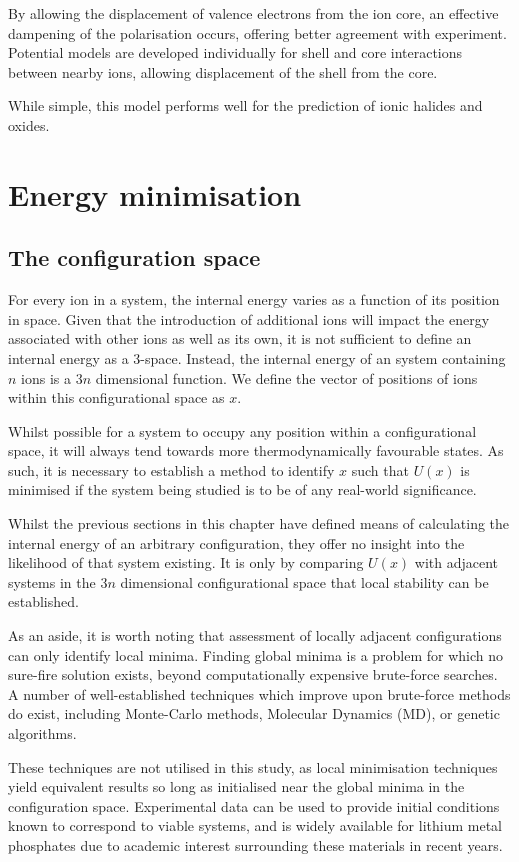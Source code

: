 By allowing the displacement of valence electrons from the ion core, an effective dampening of the polarisation occurs, offering better agreement with experiment.
Potential models are developed individually for shell and core interactions between nearby ions, allowing displacement of the shell from the core.


While simple, this model performs well for the prediction of ionic halides and oxides.
\section{Energy minimisation}
\subsection{The configuration space}
For every ion in a system, the internal energy varies as a function of its position in space.
Given that the introduction of additional ions will impact the energy associated with other ions as well as its own, it is not sufficient to define an internal energy as a 3-space.
Instead, the internal energy of an system containing $n$ ions is a $3n$ dimensional function.
We define the vector of positions of ions within this configurational space as $x$.

Whilst possible for a system to occupy any position within a configurational space, it will always tend towards more thermodynamically favourable states.
As such, it is necessary to establish a method to identify $x$ such that $U(x)$ is minimised if the system being studied is to be of any real-world significance.

Whilst the previous sections in this chapter have defined means of calculating the internal energy of an arbitrary configuration, they offer no insight into the likelihood of that system existing.
It is only by comparing $U(x)$ with adjacent systems in the $3n$ dimensional configurational space that local stability can be established.


As an aside, it is worth noting that assessment of locally adjacent configurations can only identify local minima.
Finding global minima is a problem for which no sure-fire solution exists, beyond computationally expensive brute-force searches.
A number of well-established techniques which improve upon brute-force methods do exist, including Monte-Carlo methods,\cite{Allan2001} Molecular Dynamics (MD), or genetic algorithms. \cite{Barnes1992}

These techniques are not utilised in this study, as local minimisation techniques yield equivalent results so long as initialised near the global minima in the configuration space.
Experimental data can be used to provide initial conditions known to correspond to viable systems, and is widely available for lithium metal phosphates due to academic interest surrounding these materials in recent years.

